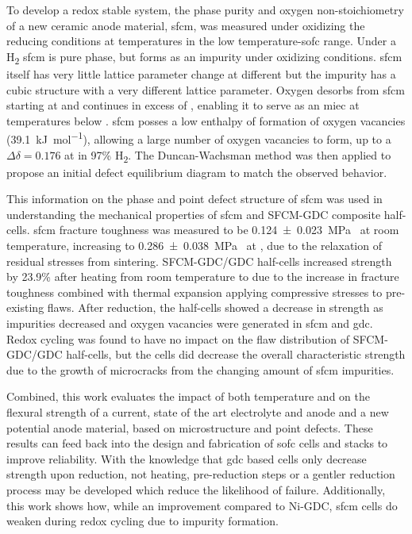 To develop a redox stable system, the phase purity and oxygen non-stoichiometry of a new ceramic anode material, \gls{sfcm}, was measured under oxidizing the reducing conditions at temperatures in the low temperature-\gls{sofc} range.
Under a H\textsubscript{2} \gls{sfcm} is pure phase, but forms  as an impurity under oxidizing conditions.
\Gls{sfcm} itself has very little lattice parameter change at different  but the impurity  has a cubic structure with a very different lattice parameter.
Oxygen desorbs from \Gls{sfcm} starting at  and continues in excess of , enabling it to serve as an \gls{miec} at temperatures below .
\Gls{sfcm} posses a low enthalpy of formation of oxygen vacancies (\SI{39.1}{\kilo\joule\per\mol}), allowing a large number of oxygen vacancies to form, up to a $\Delta\delta = 0.176$ at  in 97\% H\textsubscript{2}.
The Duncan-Wachsman method was then applied to propose an initial defect equilibrium diagram to match the observed behavior.

This information on the phase and point defect structure of \gls{sfcm} was used in understanding the mechanical properties of \gls{sfcm} and SFCM-GDC composite half-cells.
\Gls{sfcm} fracture toughness was measured to be \SI[separate-uncertainty = true]{0.124 +- 0.023}{\mega\pascal{}} at room temperature, increasing to \SI[separate-uncertainty = true]{0.286 +- 0.038}{\mega\pascal{}} at , due to the relaxation of residual stresses from sintering.
SFCM-GDC/GDC half-cells increased strength by 23.9\% after heating from room temperature to  due to the increase in fracture toughness combined with thermal expansion applying compressive stresses to pre-existing flaws.
After reduction, the half-cells showed a decrease in strength as impurities decreased and oxygen vacancies were generated in \gls{sfcm} and \gls{gdc}.
Redox cycling was found to have no impact on the flaw distribution of SFCM-GDC/GDC half-cells, but the cells did decrease the overall characteristic strength due to the growth of microcracks from the changing amount of \gls{sfcm} impurities.

Combined, this work evaluates the impact of both temperature and  on the flexural strength of a current, state of the art electrolyte and anode and a new potential anode material, based on microstructure and point defects.
These results can feed back into the design and fabrication of \gls{sofc} cells and stacks to improve reliability.
With the knowledge that \gls{gdc} based cells only decrease strength upon reduction, not heating, pre-reduction steps or a gentler reduction process may be developed which reduce the likelihood of failure.
Additionally, this work shows how, while an improvement compared to Ni-GDC, \gls{sfcm} cells do weaken during redox cycling due to impurity formation.

